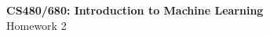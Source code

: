 \documentclass{tron}
\begin{document}
\maketitle
\clearpage
{}
\setcounter{page}{1}
\setlength{\parskip}{5pt}
\newpage

\begin{center}
  \large{\textbf{CS480/680: Introduction to Machine Learning} \\ Homework 2\\ }
\end{center}
\end{document}
